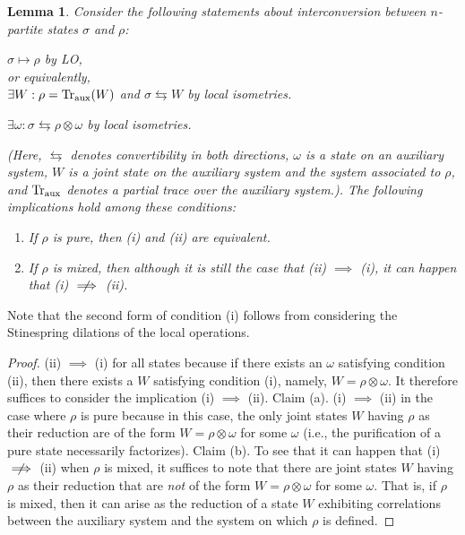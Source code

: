 \documentclass[prx,11pt,letterpaper,twocolumn,accepted=2023-11-27]{quantumarticle}
\theoremstyle{plain}
\newtheorem{lem}[theo]{Lemma}
\theoremstyle{definition}
\newcommand{\nimplies}{\centernot{\implies}}
\begin{document}
 \begin{samepage}
\begin{lem}
    \label{lem:conversion2}
    Consider the following statements about interconversion between $n$-partite states $\sigma$ and $\rho$:
    \begin{compactenum}[(i)]
        \item  $\sigma \mapsto \rho $ by LO,\\
         or equivalently,\\
          $\exists W : \rho = {\rm Tr}_{\rm aux}( W)$ and $\sigma \leftrightarrows
         W $ by local isometries.
        \item  
        $\exists \omega : \sigma \leftrightarrows
          \rho  \otimes \omega$ by local isometries. 
    \end{compactenum}
 (Here, $\leftrightarrows$ denotes convertibility in both directions, $\omega$ is a state on an auxiliary system, $W$ is a joint state on the auxiliary system and the system associated to $\rho$, and ${\rm Tr}_{\rm aux}$ denotes a partial trace over the auxiliary system.). The following implications hold among these conditions:
 \begin{enumerate}
 \item[(a)] If $\rho$ is pure, then (i) and (ii) are equivalent.
\item[(b)] If $\rho$ is mixed, then although it is still the case that (ii) $\implies$ (i), it can happen that (i) $\nimplies$ (ii).
 \end{enumerate} 
\end{lem}
\end{samepage}
 Note that the second form of condition (i) follows from considering the Stinespring dilations of the local operations.   
 
\begin{proof}
  (ii) $\implies$ (i) for all states because if there exists an $\omega$ satisfying condition (ii), then there exists a $W$ satisfying condition (i), namely, $W= \rho \otimes \omega$.  It therefore suffices to consider the implication (i) $\implies$ (ii).  Claim (a).  (i) $\implies$ (ii) in the case where $\rho$ is pure because in this case, the only joint states $W$ having $\rho$ as their reduction are of the form ${W=\rho \otimes \omega}$ for some $\omega$ (i.e., the purification of a pure state necessarily factorizes).  Claim (b).  To see that it can happen that (i) $\nimplies$ (ii) when $\rho$ is mixed, it suffices to note that there are joint states $W$ having $\rho$ as their reduction that are {\em not} of the form ${W=\rho \otimes \omega}$ for some $\omega$.  That is, if $\rho$ is mixed, then it can arise as the reduction of a state $W$ exhibiting correlations between the auxiliary system and the system on which $\rho$ is defined.
\end{proof}
\end{document}
